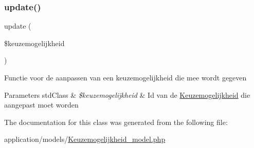 \mbox{\label{class_keuzemogelijkheid___model_a933a162ba87e58d4cc7eb781fd571a7a}} 
\subsubsection{\texorpdfstring{update()}{update()}}
{\footnotesize\ttfamily update (\begin{DoxyParamCaption}\item[{}]{\$keuzemogelijkheid }\end{DoxyParamCaption})}

Functie voor de aanpassen van een keuzemogelijkheid die mee wordt gegeven 
\begin{DoxyParams}[1]{Parameters}
std\+Class & {\em \$keuzemogelijkheid} & Id van de \mbox{\hyperlink{class_keuzemogelijkheid}{Keuzemogelijkheid}} die aangepast moet worden \\
\hline
\end{DoxyParams}


The documentation for this class was generated from the following file\+:\begin{DoxyCompactItemize}
\item 
application/models/\mbox{\hyperlink{_keuzemogelijkheid__model_8php}{Keuzemogelijkheid\+\_\+model.\+php}}\end{DoxyCompactItemize}
